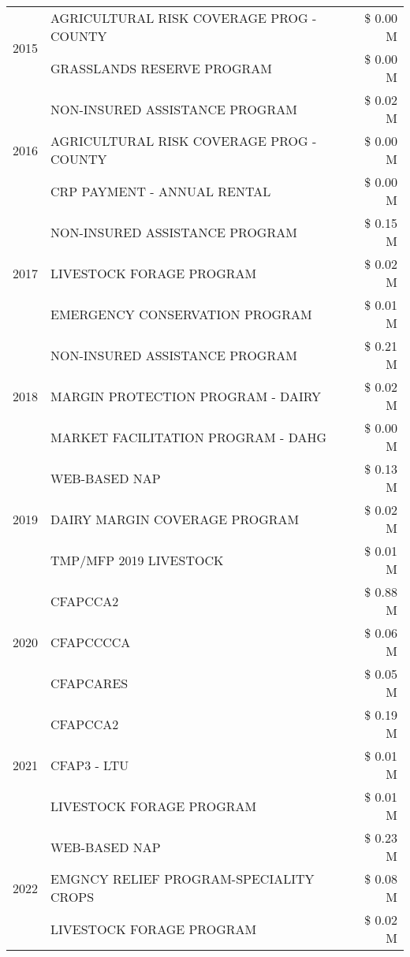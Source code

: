 \begin{tabular}{llr}
\cline{1-3}
\multirow[t]{2}{*}{2015} & AGRICULTURAL RISK COVERAGE PROG - COUNTY & \$ 0.00 M \\
 & GRASSLANDS RESERVE PROGRAM & \$ 0.00 M \\
\cline{1-3}
\multirow[t]{3}{*}{2016} & NON-INSURED ASSISTANCE PROGRAM & \$ 0.02 M \\
 & AGRICULTURAL RISK COVERAGE PROG - COUNTY & \$ 0.00 M \\
 & CRP PAYMENT - ANNUAL RENTAL & \$ 0.00 M \\
\cline{1-3}
\multirow[t]{3}{*}{2017} & NON-INSURED ASSISTANCE PROGRAM & \$ 0.15 M \\
 & LIVESTOCK FORAGE PROGRAM & \$ 0.02 M \\
 & EMERGENCY CONSERVATION PROGRAM & \$ 0.01 M \\
\cline{1-3}
\multirow[t]{3}{*}{2018} & NON-INSURED ASSISTANCE PROGRAM & \$ 0.21 M \\
 & MARGIN PROTECTION PROGRAM - DAIRY & \$ 0.02 M \\
 & MARKET FACILITATION PROGRAM - DAHG & \$ 0.00 M \\
\cline{1-3}
\multirow[t]{3}{*}{2019} & WEB-BASED NAP & \$ 0.13 M \\
 & DAIRY MARGIN COVERAGE PROGRAM & \$ 0.02 M \\
 & TMP/MFP 2019 LIVESTOCK & \$ 0.01 M \\
\cline{1-3}
\multirow[t]{3}{*}{2020} & CFAPCCA2 & \$ 0.88 M \\
 & CFAPCCCCA & \$ 0.06 M \\
 & CFAPCARES & \$ 0.05 M \\
\cline{1-3}
\multirow[t]{3}{*}{2021} & CFAPCCA2 & \$ 0.19 M \\
 & CFAP3 - LTU & \$ 0.01 M \\
 & LIVESTOCK FORAGE PROGRAM & \$ 0.01 M \\
\cline{1-3}
\multirow[t]{3}{*}{2022} & WEB-BASED NAP & \$ 0.23 M \\
 & EMGNCY RELIEF PROGRAM-SPECIALITY CROPS & \$ 0.08 M \\
 & LIVESTOCK FORAGE PROGRAM & \$ 0.02 M \\
\cline{1-3}
\bottomrule
\end{tabular}
